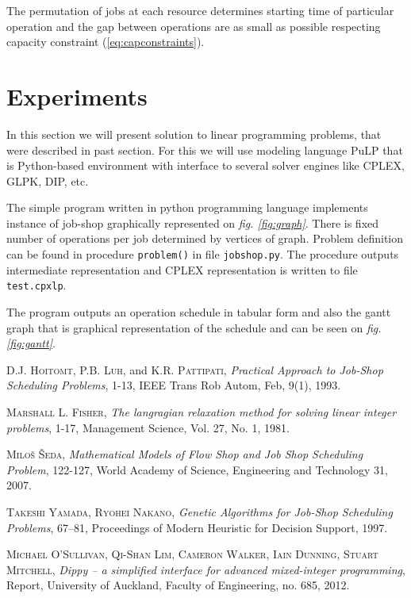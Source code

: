 \documentclass[a4paper,journal,twocolumn]{IEEEtran}
\begin{document}
The permutation of jobs at each resource determines starting time of particular operation 
and the gap between operations are as small as possible respecting capacity constraint (\ref{eq:capconstraints}).

\section{Experiments}
In this section we will present solution to linear programming problems, that were described in past section.
For this we will use modeling language PuLP that is Python-based environment with interface to several solver engines like CPLEX, GLPK, DIP, etc.

The simple program written in python programming language implements instance of job-shop graphically represented on \emph{fig. \ref{fig:graph}}.
There is fixed number of operations per job determined by vertices of graph.
Problem definition can be found in procedure \texttt{problem()}  in file \texttt{jobshop.py}. 
The procedure outputs intermediate representation 
and CPLEX representation is written to file \texttt{test.cpxlp}.

The program outputs an operation schedule in tabular form and also the gantt graph that is graphical representation of the schedule and can be seen on
\emph{fig. \ref{fig:gantt}}. 



\begin{thebibliography}{1}

 \textsc{D.J. Hoitomt}, \textsc{P.B. Luh}, and \textsc{K.R. Pattipati}, \emph{Practical Approach to Job-Shop Scheduling
Problems}, 1-13, IEEE Trans Rob Autom, Feb, 9(1), 1993.

 \textsc{Marshall L. Fisher}, \emph{The langragian relaxation method for solving linear integer problems}, 1-17, 
Management Science, Vol. 27, No. 1, 1981.

 \textsc{Miloš Šeda}, \emph{Mathematical Models of Flow Shop and Job Shop Scheduling Problem}, 122-127, World Academy of Science, Engineering and Technology 31, 2007.

 \textsc{Takeshi Yamada, Ryohei Nakano}, \emph{Genetic Algorithms for Job-Shop  Scheduling Problems}, 67–81, Proceedings of Modern Heuristic for Decision Support, 1997.

 \textsc{Michael O’Sullivan, Qi-Shan Lim, Cameron Walker, Iain Dunning, Stuart Mitchell}, \emph{Dippy – a simplified interface for advanced mixed-integer programming}, Report, University of Auckland, Faculty of Engineering, no. 685, 2012.


\end{thebibliography}
\end{document}
